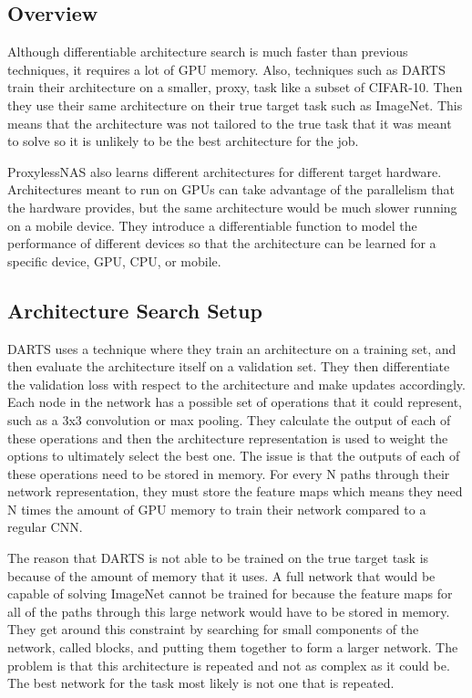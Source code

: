 \documentclass{ieee}
\begin{document}
\subsection{Overview}
Although differentiable architecture search is much faster than previous techniques, it requires a lot of GPU memory. Also, techniques such as DARTS train their architecture on a smaller, proxy, task like a subset of CIFAR-10. Then they use their same architecture on their true target task such as ImageNet. This means that the architecture was not tailored to the true task that it was meant to solve so it is unlikely to be the best architecture for the job.

ProxylessNAS also learns different architectures for different target hardware. Architectures meant to run on GPUs can take advantage of the parallelism that the hardware provides, but the same architecture would be much slower running on a mobile device. They introduce a differentiable function to model the performance of different devices so that the architecture can be learned for a specific device, GPU, CPU, or mobile. 

\subsection{Architecture Search Setup}
DARTS uses a technique where they train an architecture on a training set, and then evaluate the architecture itself on a validation set. They then differentiate the validation loss with respect to the architecture and make updates accordingly. Each node in the network has a possible set of operations that it could represent, such as a 3x3 convolution or max pooling. They calculate the output of each of these operations and then the architecture representation is used to weight the options to ultimately select the best one. The issue is that the outputs of each of these operations need to be stored in memory. For every N paths through their network representation, they must store the feature maps which means they need N times the amount of GPU memory to train their network compared to a regular CNN.

The reason that DARTS is not able to be trained on the true target task is because of the amount of memory that it uses. A full network that would be capable of solving ImageNet cannot be trained for because the feature maps for all of the paths through this large network would have to be stored in memory. They get around this constraint by searching for small components of the network, called blocks, and putting them together to form a larger network. The problem is that this architecture is repeated and not as complex as it could be. The best network for the task most likely is not one that is repeated.
\end{document}
